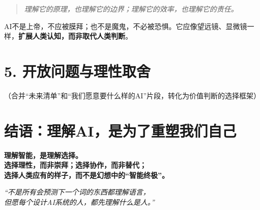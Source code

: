 \begin{quote}
\textit{理解它的原理，也理解它的边界；理解它的效率，也理解它的责任。}
\end{quote}

AI不是上帝，不应被膜拜；也不是魔鬼，不必被恐惧。它应像望远镜、显微镜一样，\textbf{扩展人类认知，而非取代人类判断}。

\section*{5. 开放问题与理性取舍}
（合并“未来清单”和“我们愿意要什么样的AI”片段，转化为价值判断的选择框架）

\section*{结语：理解AI，是为了重塑我们自己}
\textbf{理解智能，是理解选择。\\
选择理性，而非崇拜；选择协作，而非替代；\\
选择人类应有的样子，而不是幻想中的“智能终极”。}

\begin{center}
\textit{“不是所有会预测下一个词的东西都理解语言，\\
但愿每个设计AI系统的人，都先理解什么是人。”}
\end{center}
